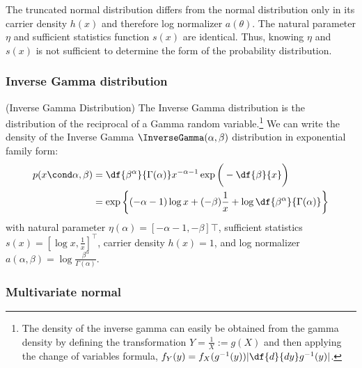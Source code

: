 \documentclass{article} %
\newcommand{\logNormalizerFunction}{a}
\newcommand{\sufficientStatsFunction}{s}
\newcommand{\carrierDensity}{h}
\begin{document}
\begin{remark}
The truncated normal distribution differs from the normal distribution only in its carrier density $\carrierDensity(x)$ and therefore log normalizer $\logNormalizerFunction(\theta)$.  The natural parameter $\eta$ and sufficient statistics function $\sufficientStatsFunction(x)$ are identical.   Thus,  knowing $\eta$ and $\sufficientStatsFunction(x)$ is not sufficient to determine the form of the probability distribution.
\label{rk:truncated_normal_differs_from_normal_only_in_terms_of_carrier_density}
\end{remark}


\subsubsection{Inverse Gamma distribution}

\begin{example}{(Inverse Gamma Distribution)} 
\label{ex:inverse_gamma_as_ef} The Inverse Gamma distribution is the distribution of the reciprocal of a Gamma random variable.\footnote{The density of the inverse gamma can easily be obtained from the gamma density by defining the transformation $Y = \frac{1}{X} := g(X)$ and then applying the change of variables formula,  $f_Y(y) = f_X (g^{-1}(y)) | \df{d}{dy} g^{-1}(y)|$.}  We can write the density of the Inverse Gamma $\InverseGamma(\alpha,  \beta)$ distribution in exponential family form:
\begin{align*}
p (x \cond \alpha,  \beta) &= \df{\beta^\alpha}{ \Gamma (\alpha) } x^{-\alpha -1} \exp \bigg(- \df{\beta}{x} \bigg) \\
&= \exp \bigg\{ (-\alpha - 1) \log x + (- \beta) \frac{1}{x} + \log \df{\beta^\alpha}{\Gamma(\alpha)} \bigg\}
\end{align*}
with natural parameter $\eta(\alpha) = [-\alpha-1,  -\beta]\top$, sufficient statistics $\sufficientStatsFunction(x) = [\log x ,  \frac{1}{x}]^\top$, carrier density $\carrierDensity(x)=1$, and log normalizer $a(\alpha,  \beta) =  \log \frac{\beta^\alpha}{\Gamma(\alpha)} $. 
  
\end{example} 

\subsubsection{Multivariate normal}
\end{document}
